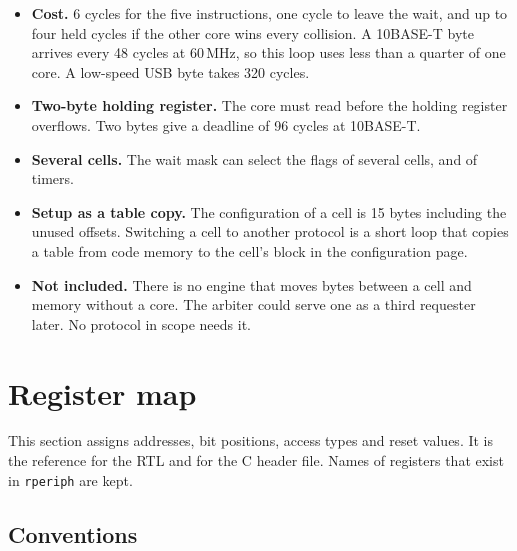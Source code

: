 \documentclass[10pt,a4paper]{article}
\begin{document}
\begin{itemize}
\item \textbf{Cost.} 6 cycles for the five instructions, one cycle to leave the wait, and up to four held cycles if the other core wins every collision. A 10BASE-T byte arrives every 48 cycles at 60\,MHz, so this loop uses less than a quarter of one core. A low-speed USB byte takes 320 cycles.
\item \textbf{Two-byte holding register.} The core must read before the holding register overflows. Two bytes
give a deadline of 96 cycles at 10BASE-T.
\item \textbf{Several cells.} The wait mask can select the flags of several cells, and of timers.
\item \textbf{Setup as a table copy.} The configuration of a cell is 15 bytes including the unused offsets. Switching a cell to another protocol is a short loop that copies a table from code memory to the cell's block in the configuration page.
\item \textbf{Not included.} There is no engine that moves bytes between a cell and memory without a core. The arbiter could serve one as a third requester later. No protocol in scope needs it.
\end{itemize}

\section{Register map}\label{sec:map}

This section assigns addresses, bit positions, access types and reset values. It is the reference for the RTL
and for the C header file. Names of registers that exist in \texttt{rperiph} are kept.

\subsection{Conventions}
\end{document}
